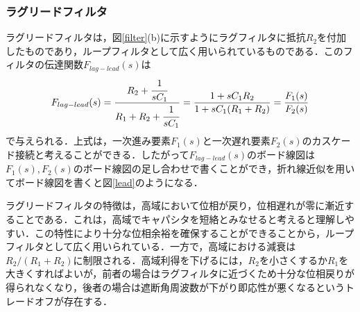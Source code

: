 \subsubsection{ラグリードフィルタ}
ラグリードフィルタは，図\ref{filter}(b)に示すようにラグフィルタに抵抗$R_2$を付加したものであり，ループフィルタとして広く用いられているものである．このフィルタの伝達関数$F_{lag-lead}(s)$は
\begin{align}
F_{lag-lead}(s)=\frac{R_2+\cfrac{1}{sC_1}}{R_1+R_2+\cfrac{1}{sC_1}}=\frac{1+sC_1 R_2}{1+sC_1(R_1+R_2)}=\frac{F_1(s)}{F_2(s)}
\end{align}
で与えられる．上式は，一次進み要素$F_1(s)$と一次遅れ要素$F_2(s)$のカスケード接続と考えることができる．したがって$F_{lag-lead}(s)$のボード線図は$F_1(s),F_2(s)$のボード線図の足し合わせで書くことができ，折れ線近似を用いてボード線図を書くと図\ref{lead}のようになる．\par 
ラグリードフィルタの特徴は，高域において位相が戻り，位相遅れが零に漸近することである．これは，高域でキャパシタを短絡とみなせると考えると理解しやすい．この特性により十分な位相余裕を確保することができることから，ループフィルタとして広く用いられている．一方で，高域における減衰は$R_2/(R_1+R_2)$に制限される．高域利得を下げるには，$R_2$を小さくするか$R_1$を大きくすればよいが，前者の場合はラグフィルタに近づくため十分な位相戻りが得られなくなり，後者の場合は遮断角周波数が下がり即応性が悪くなるというトレードオフが存在する．

